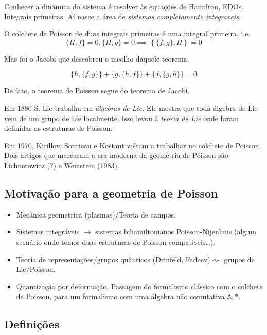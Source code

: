 Conhecer a dinâmica do sistema é resolver às equações de Hamilton, EDOs. Integrais primeiras. Aí nasce a área de \textit{sistemas completamente integraveis}.

\begin{thm}[de Poisson, 1809]\leavevmode
O colchete de Poisson de duas integrais primeiras é uma integral primeira, i.e.
\[\{H,f\}=0,\{H,g\}=0 \implies \left\{ \{f,g\},H \right\} =0\]
\end{thm}

Mas foi o Jacobi que descobreu o meolho daquele teorema:
\begin{thm}[Jacobi, 1842]\leavevmode
\[\{h,\{f,g\}\} +\{g,\{h,f\}\} +\{f,\{g,h\}\} =0\]
\end{thm}
De fato, o teorema de Poisson segue do teorema de Jacobi.

Em 1880 S. Lie trabalha em \textit{álgebras de Lie}. Ele mostra que toda álgebra de Lie vem de um grupo de Lie localmente. Isso levou à \textit{teoria de Lie} onde foram definidas as estruturas de Poisson.

Em 1970, Kirillov, Sourieau e Kostant voltam a trabalhar no colchete de Poisson. Dois artigos que marcaram a era moderna da geometria de Poisson são Lichnerowicz (?) e Weinstein (1983).

\subsection{Motivação para a geometria de Poisson}

\begin{itemize}
\item Mecânica geometrica (plasmas)/Teoria de campos.
\item Sistemas integráveis \(\to\) sistemas bihamiltonianos Poisson-Nijenhuis (algum scenário onde temos duas estruturas de Poisson compatíveis…).
\item Teoria de representações/grupos quânticos (Drinfeld, Fadeev)\(\rightsquigarrow \) grupos de Lie/Poisson.
\item Quantização por deformação. Passagem do formalismo clássico com o colchete de Poisson, para um formalismo com uma álgebra não comutativa \(\mathbb{A},*\).
\end{itemize}

\subsection{Definições}

